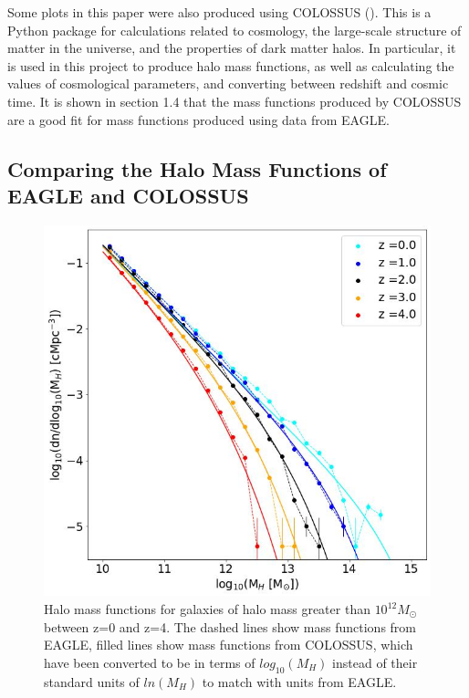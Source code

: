 \documentclass[12pt, twocolumn]{article}%
\begin{document}
Some plots in this paper were also produced using COLOSSUS (\cite{COLOSSUS}). This is a Python package for calculations related to cosmology, the large-scale structure of matter in the universe, and the properties of dark matter halos. In particular, it is used in this project to produce halo mass functions, as well as calculating the values of cosmological parameters, and converting between redshift and cosmic time. It is shown in section 1.4 that the mass functions produced by COLOSSUS are a good fit for mass functions produced using data from EAGLE.

\subsection{Comparing the Halo Mass Functions of EAGLE and COLOSSUS}

\begin{figure}[H]
\centering
\includegraphics[width=\linewidth]{Mass_Function.jpeg}
\caption{Halo mass functions for galaxies of halo mass greater than $10^{12}M_\odot$ between z=0 and z=4. The dashed lines show mass functions from EAGLE, filled lines show mass functions from COLOSSUS, which have been converted to be in terms of $log_{10}(M_H)$ instead of their standard units of $ln(M_H)$ to match with units from EAGLE.}
\label{fig:1}
\end{figure}
\end{document}
